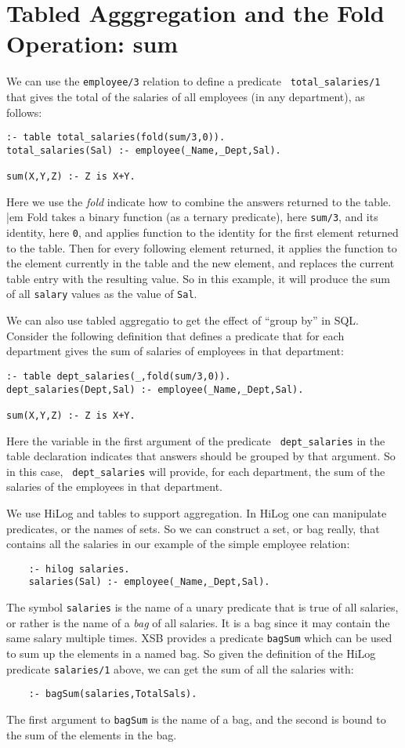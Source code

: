 \section{Tabled Agggregation and the Fold Operation: sum}

We can use the {\tt employee/3} relation to define a predicate {\tt
  total\_salaries/1} that gives the total of the salaries of all
employees (in any department), as follows:

\begin{verbatim}
:- table total_salaries(fold(sum/3,0)).
total_salaries(Sal) :- employee(_Name,_Dept,Sal).

sum(X,Y,Z) :- Z is X+Y.  
\end{verbatim}

Here we use the {\em fold} indicate how to combine the answers
returned to the table.  {|em Fold} takes a binary function (as a
ternary predicate), here {\tt sum/3}, and its identity, here {\tt 0},
and applies function to the identity for the first element returned to
the table.  Then for every following element returned, it applies the
function to the element currently in the table and the new element,
and replaces the current table entry with the resulting value.  So in
this example, it will produce the sum of all {\tt salary} values as
the value of {\tt Sal}.

We can also use tabled aggregatio to get the effect of ``group by'' in
SQL.  Consider the following definition that defines a predicate that
for each department gives the sum of salaries of employees in that
department:
\begin{verbatim}
:- table dept_salaries(_,fold(sum/3,0)).
dept_salaries(Dept,Sal) :- employee(_Name,_Dept,Sal).

sum(X,Y,Z) :- Z is X+Y.  
\end{verbatim}
Here the variable in the first argument of the predicate {\tt
  dept\_salaries} in the table declaration indicates that answers
should be grouped by that argument.  So in this case, {\tt
  dept\_salaries} will provide, for each department, the sum of the
salaries of the employees in that department.


We use HiLog and tables to support aggregation.  In HiLog one
can manipulate predicates, or the names of sets.  So we can construct
a set, or bag really, that contains all the salaries in our example of
the simple employee relation:
\begin{verbatim}
    :- hilog salaries.
    salaries(Sal) :- employee(_Name,_Dept,Sal).
\end{verbatim}
The symbol \verb|salaries| is the name of a unary predicate that is
true of all salaries, or rather is the name of a {\em bag} of all
salaries.  It is a bag since it may contain the same salary multiple
times.  XSB provides a predicate \verb|bagSum| which can be used to
sum up the elements in a named bag.  So given the definition of the
HiLog predicate \verb|salaries/1| above, we can get the sum of all the
salaries with:
\begin{verbatim}
    :- bagSum(salaries,TotalSals).
\end{verbatim}
The first argument to \verb|bagSum| is the name of a bag, and the
second is bound to the sum of the elements in the bag.


